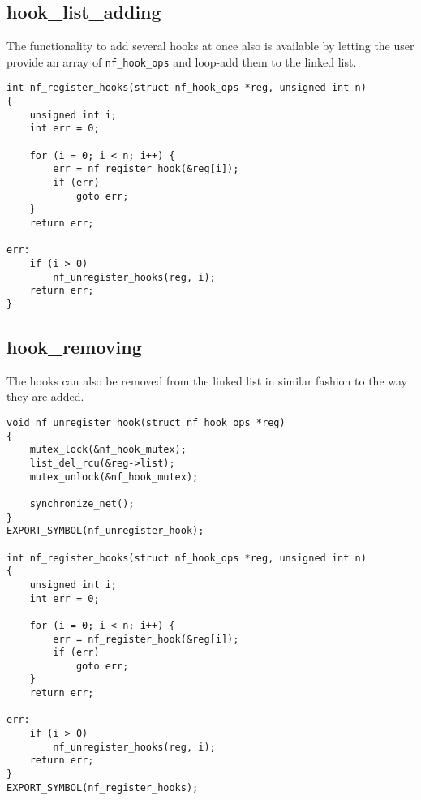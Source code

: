 \subsection{hook_list_adding}\label{Hook List Adding}
The functionality to add several hooks at once also is available by letting the user provide an array of \verb|nf_hook_ops| and loop-add them to the linked list.

\begin{lstlisting}
int nf_register_hooks(struct nf_hook_ops *reg, unsigned int n)
{
	unsigned int i;
	int err = 0;

	for (i = 0; i < n; i++) {
		err = nf_register_hook(&reg[i]);
		if (err)
			goto err;
	}
	return err;

err:
	if (i > 0)
		nf_unregister_hooks(reg, i);
	return err;
}
\end{lstlisting}

\subsection{hook_removing}\label{Hook And Hook-List Removing}
The hooks can also be removed from the linked list in similar fashion to the way they are added.

\begin{lstlisting}
void nf_unregister_hook(struct nf_hook_ops *reg)
{
	mutex_lock(&nf_hook_mutex);
	list_del_rcu(&reg->list);
	mutex_unlock(&nf_hook_mutex);

	synchronize_net();
}
EXPORT_SYMBOL(nf_unregister_hook);

int nf_register_hooks(struct nf_hook_ops *reg, unsigned int n)
{
	unsigned int i;
	int err = 0;

	for (i = 0; i < n; i++) {
		err = nf_register_hook(&reg[i]);
		if (err)
			goto err;
	}
	return err;

err:
	if (i > 0)
		nf_unregister_hooks(reg, i);
	return err;
}
EXPORT_SYMBOL(nf_register_hooks);
\end{lstlisting}
